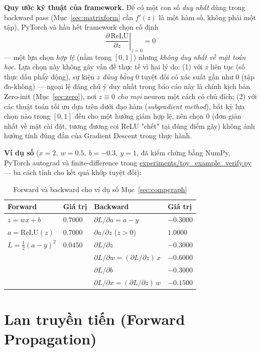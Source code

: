 \documentclass[12pt,a4paper]{report}
\newcommand{\en}[1]{\textit{#1}}
\begin{document}
\textbf{Quy ước kỹ thuật của framework.} Để có một con số \emph{duy nhất}
dùng trong backward pass (Mục~\ref{sec:matrixform} cần $f'(z)$ là một hàm
số, không phải một tập), PyTorch và hầu hết framework chọn cố định
$$\left.\frac{\partial\,\mathrm{ReLU}}{\partial z}\right\vert_{z=0} = 0$$
--- một lựa chọn \emph{hợp lệ} (nằm trong $[0,1]$) nhưng \emph{không duy
nhất về mặt toán học}. Lựa chọn này không gây vấn đề thực tế vì hai lý do:
(1) với $z$ liên tục (số thực dấu phẩy động), sự kiện $z$ \emph{đúng bằng}
$0$ tuyệt đối có xác suất gần như $0$ (tập đo-không) --- ngoại lệ đáng chú
ý duy nhất trong báo cáo này là chính kịch bản Zero-init
(Mục~\ref{sec:zero}), nơi $z\equiv0$ \emph{cho mọi} neuron một cách có chủ
đích; (2) với các thuật toán tối ưu dựa trên dưới đạo hàm
(\en{subgradient method}), bất kỳ lựa chọn nào trong $[0,1]$ đều cho một
hướng giảm hợp lệ, nên chọn $0$ (đơn giản nhất về mặt cài đặt, tương
đương coi ReLU "chết" tại đúng điểm gãy) không ảnh hưởng tính đúng đắn
của Gradient Descent trong thực hành.

\textbf{Ví dụ số} ($x=2,\ w=0.5,\ b=-0.3,\ y=1$, đã kiểm chứng bằng
NumPy, PyTorch autograd và finite-difference trong
\url{experiments/toy_example_verify.py} --- ba cách tính cho kết quả
khớp tuyệt đối):

\begin{table}[htbp]
\centering
\caption{Forward và backward cho ví dụ số Mục~\ref{sec:compgraph}}
\begin{tabular}{@{}llll@{}}
\toprule
\textbf{Forward} & \textbf{Giá trị} & \textbf{Backward} & \textbf{Giá trị} \\
\midrule
$z=wx+b$ & $0.7000$ & $\partial L/\partial a = a-y$ & $-0.3000$ \\
$a=\mathrm{ReLU}(z)$ & $0.7000$ & $\partial a/\partial z$ ($z>0$) & $1.0000$ \\
$L=\tfrac12(a-y)^2$ & $0.0450$ & $\partial L/\partial z$ & $-0.3000$ \\
 & & $\partial L/\partial w = (\partial L/\partial z)\,x$ & $-0.6000$ \\
 & & $\partial L/\partial b$ & $-0.3000$ \\
 & & $\partial L/\partial x = (\partial L/\partial z)\,w$ & $-0.1500$ \\
\bottomrule
\end{tabular}
\label{tab:compgraph_numeric}
\end{table}

\section{Lan truyền tiến (Forward Propagation)}
\label{sec:forward}
\end{document}
